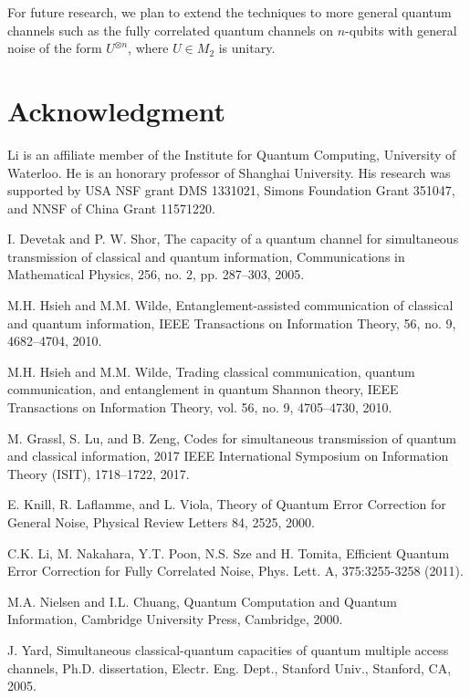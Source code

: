 \documentclass[11pt]{article}
\begin{document}
 

\medskip
For future research, 
we plan to extend the techniques to more general quantum channels 
such as the fully correlated quantum channels on $n$-qubits
with general noise of the form $U^{\otimes n}$, where $U \in M_2$
is unitary.

\section*{Acknowledgment}


Li is an affiliate member of the Institute for Quantum Computing,
University of Waterloo. He is an honorary professor of Shanghai
University. His research was supported by USA NSF grant DMS 1331021,
Simons Foundation Grant 351047, and NNSF of China Grant 11571220. 


\begin{thebibliography}{WWW}


 I. Devetak and P. W. Shor,  The capacity of a quantum channel
for simultaneous transmission of classical and quantum information, 
Communications in Mathematical Physics,  256, no. 2, pp. 287–303,
2005.



  M.H. Hsieh  and M.M. Wilde,  Entanglement-assisted communication of classical and quantum information, IEEE Transactions on Information Theory, 56, no. 9, 4682--4704, 2010.

 M.H. Hsieh  and M.M. Wilde,  Trading classical communication, quantum communication, and entanglement in quantum Shannon theory, IEEE Transactions on Information
Theory, vol. 56, no. 9,   4705--4730,   2010.


 M. Grassl, S. Lu, and B. Zeng, Codes for simultaneous transmission of quantum and 
classical information, 
2017 IEEE International Symposium on Information Theory (ISIT),  1718--1722, 2017.


E. Knill, R. Laflamme, and L. Viola, 
Theory of Quantum Error Correction for General Noise,
Physical Review
Letters 84, 2525, 2000.

 C.K. Li, M. Nakahara, Y.T. Poon, N.S. Sze and H. Tomita,
Efficient Quantum Error Correction for Fully Correlated Noise, 
Phys. Lett. A, 375:3255-3258 (2011).

 M.A. Nielsen and I.L. Chuang,
Quantum Computation and Quantum Information, 
Cambridge University Press, Cambridge, 2000.

 J. Yard,  Simultaneous classical-quantum capacities of quantum multiple
access channels,  Ph.D. dissertation, Electr. Eng. Dept., Stanford
Univ., Stanford, CA, 2005.
 

\end{thebibliography}
\end{document}
